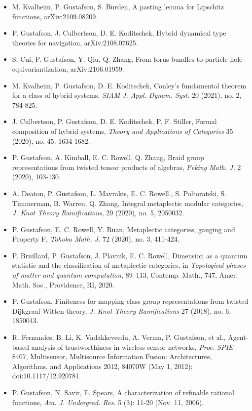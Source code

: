   \begin{itemize}

    \item[] M. Kvalheim, P. Gustafson, S. Burden, {A pasting lemma for Lipschitz functions}, arXiv:2109.08209.

  
  \item[] P. Gustafson, J. Culbertson, D. E. Koditschek, {Hybrid dynamical type theories for navigation}, arXiv:2108.07625.
  
\item[] S. Cui, P. Gustafson, Y. Qiu, Q. Zhang, {From torus bundles to particle-hole equivariantization}, arXiv:2106.01959.
  
\item[] M. Kvalheim, P. Gustafson, D. E. Koditschek, {Conley's fundamental theorem for a class of hybrid systems}, \emph{SIAM J. Appl. Dynam. Syst.} {20} (2021), no. 2, 784-825.

\item[] J. Culbertson, P. Gustafson, D. E. Koditschek, P. F. Stiller, {Formal composition of hybrid systems}, \emph{Theory and Applications of Categories} {35} (2020), no. 45, 1634-1682.

  \item[] P. Gustafson, A. Kimball, E. C. Rowell, Q. Zhang, {Braid group representations from twisted tensor products of algebras}, \emph{Peking Math. J.} 2 (2020), 103-130.

  \item[]  A. Deaton, P. Gustafson, L. Mavrakis, E. C. Rowell., S. Poltoratski, S. Timmerman, B. Warren, Q. Zhang, {Integral metaplectic modular categories}, \emph{J. Knot Theory Ramifications}, 29 (2020), no. 5, 2050032.
  
  \item[] P. Gustafson, E. C. Rowell, Y. Ruan, {Metaplectic categories, gauging and Property F}, \emph{Tohoku Math. J.} {72} (2020), no. 3, 411-424.

  \item[] P. Bruillard, P. Gustafson, J. Plavnik, E. C. Rowell, {Dimension as a quantum statistic and the classification of metaplectic categories}, in \emph{Topological phases of matter and quantum computation}, 89–113, Contemp. Math., 747, Amer. Math. Soc., Providence, RI, 2020.
    
  \item[] P. Gustafson, {Finiteness for mapping class group representations from twisted Dijkgraaf-Witten theory}, \emph{J. Knot Theory Ramifications} 27 (2018), no. 6, 1850043.

  \item[] R. Fernandes, B. Li, K. Vadakkeveedu, A. Verma, P. Gustafson, et al., {Agent-based analysis of trustworthiness in wireless sensor networks}, \emph{Proc. SPIE} {8407}, Multisensor, Multisource Information Fusion: Architectures, Algorithms, and Applications 2012, 84070W (May 1, 2012); doi:10.1117/12.920781. 

 \item[] P. Gustafson, N. Savir, E. Spears, {A characterization of refinable rational functions}, \emph{Am. J. Undergrad. Res.} {5} (3): 11-20 (Nov. 11, 2006).
  
 \end{itemize}
 
